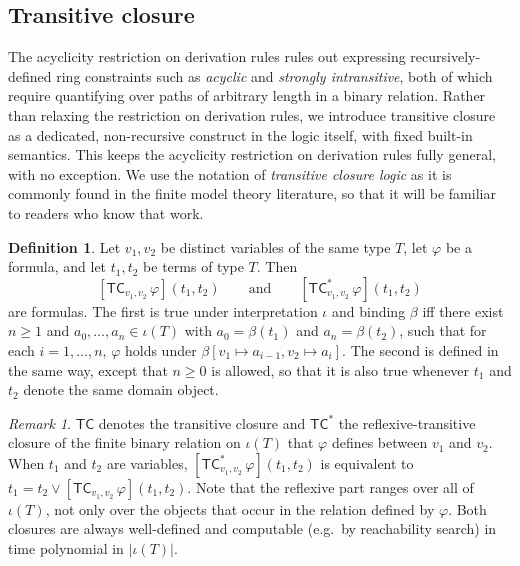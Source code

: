\documentclass[11pt]{amsart}
\theoremstyle{definition}
\newtheorem{definition}{Definition}
\theoremstyle{remark}
\newtheorem{remark}[theorem]{Remark}
\newcommand{\TC}{\mathsf{TC}}
\begin{document}
\subsection*{Transitive closure}

The acyclicity restriction on derivation rules rules out expressing
recursively-defined ring constraints such as \emph{acyclic} and
\emph{strongly intransitive}, both of which require quantifying over paths
of arbitrary length in a binary relation. Rather than relaxing the
restriction on derivation rules, we introduce transitive closure as a
dedicated, non-recursive construct in the logic itself, with fixed
built-in semantics. This keeps the acyclicity restriction on derivation
rules fully general, with no exception. We use the notation of
\emph{transitive closure logic} as it is commonly found in the finite model
theory literature, so that it will be familiar to readers who know that
work.

\begin{definition}
Let $v_1, v_2$ be distinct variables of the same type $T$, let $\varphi$
be a formula, and let $t_1, t_2$ be terms of type $T$. Then
$$[\TC_{v_1, v_2}\, \varphi](t_1, t_2)
  \qquad\text{and}\qquad
  [\TC^{*}_{v_1, v_2}\, \varphi](t_1, t_2)$$
are formulas. The first is true under interpretation $\iota$ and binding
$\beta$ iff there exist $n \geq 1$ and $a_0, \ldots, a_n \in \iota(T)$ with
$a_0 = \beta(t_1)$ and $a_n = \beta(t_2)$, such that for each
$i = 1, \ldots, n$, $\varphi$ holds under $\beta[v_1 \mapsto a_{i-1},
v_2 \mapsto a_i]$. The second is defined in the same way, except that
$n \geq 0$ is allowed, so that it is also true whenever $t_1$ and $t_2$
denote the same domain object.
\end{definition}

\begin{remark}
$\TC$ denotes the transitive closure and $\TC^{*}$ the
reflexive-transitive closure of the finite binary relation on $\iota(T)$
that $\varphi$ defines between $v_1$ and $v_2$. When $t_1$ and $t_2$ are
variables, $[\TC^{*}_{v_1, v_2}\, \varphi](t_1, t_2)$ is equivalent to
$t_1 = t_2 \vee [\TC_{v_1, v_2}\, \varphi](t_1, t_2)$. Note that the
reflexive part ranges over all of $\iota(T)$, not only over the objects
that occur in the relation defined by $\varphi$. Both closures are always
well-defined and computable (e.g.\ by reachability search) in time
polynomial in $|\iota(T)|$.
\end{remark}
\end{document}
